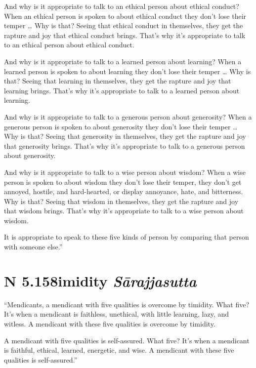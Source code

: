 \documentclass[12pt,openany]{book}%
\newcommand*{\suttatitleacronym}[1]{\smaller[2]{#1}\vspace*{.3em}}
\newcommand*{\suttatitletranslation}[1]{\linebreak{#1}}
\newcommand*{\suttatitleroot}[1]{\linebreak\smaller[2]\itshape{#1}}
\newcommand*{\tocacronym}[1]{\hspace*{-3.3em}{#1}\quad}
\newcommand*{\toctranslation}[1]{#1}
\newcommand*{\tocroot}[1]{(\textit{#1})}
\begin{document}
And why is it appropriate to talk to an ethical person about ethical conduct? When an ethical person is spoken to about ethical conduct they don’t lose their temper … Why is that? Seeing that ethical conduct in themselves, they get the rapture and joy that ethical conduct brings. That’s why it’s appropriate to talk to an ethical person about ethical conduct. 

And why is it appropriate to talk to a learned person about learning? When a learned person is spoken to about learning they don’t lose their temper … Why is that? Seeing that learning in themselves, they get the rapture and joy that learning brings. That’s why it’s appropriate to talk to a learned person about learning. 

And why is it appropriate to talk to a generous person about generosity? When a generous person is spoken to about generosity they don’t lose their temper … Why is that? Seeing that generosity in themselves, they get the rapture and joy that generosity brings. That’s why it’s appropriate to talk to a generous person about generosity. 

And why is it appropriate to talk to a wise person about wisdom? When a wise person is spoken to about wisdom they don’t lose their temper, they don’t get annoyed, hostile, and hard-hearted, or display annoyance, hate, and bitterness. Why is that? Seeing that wisdom in themselves, they get the rapture and joy that wisdom brings. That’s why it’s appropriate to talk to a wise person about wisdom. 

It is appropriate to speak to these five kinds of person by comparing that person with someone else.” 

%
\section*{{\suttatitleacronym AN 5.158}{\suttatitletranslation Timidity }{\suttatitleroot Sārajjasutta}}
\addcontentsline{toc}{section}{\tocacronym{AN 5.158} \toctranslation{Timidity } \tocroot{Sārajjasutta}}

“Mendicants, a mendicant with five qualities is overcome by timidity. What five? It’s when a mendicant is faithless, unethical, with little learning, lazy, and witless. A mendicant with these five qualities is overcome by timidity. 

A mendicant with five qualities is self-assured. What five? It’s when a mendicant is faithful, ethical, learned, energetic, and wise. A mendicant with these five qualities is self-assured.” 
\end{document}
